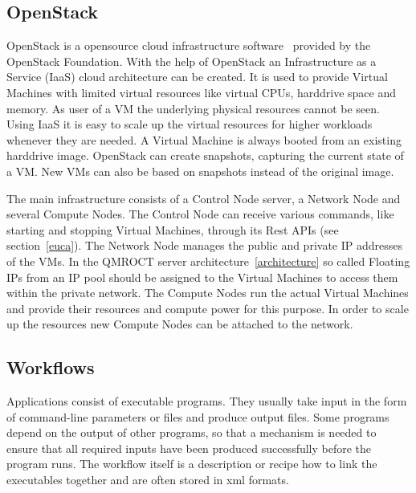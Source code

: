 \subsection{OpenStack}\label{openstack}

OpenStack is a opensource cloud infrastructure software~\cite{openstackhome} provided by the OpenStack Foundation.
With the help of OpenStack an Infrastructure as a Service (IaaS) cloud architecture can be created.
It is used to provide Virtual Machines with limited virtual resources like virtual CPUs, harddrive space and memory.
As user of a VM the underlying physical resources cannot be seen.
Using IaaS it is easy to scale up the virtual resources for higher workloads whenever they are needed.
A Virtual Machine is always booted from an existing harddrive image.
OpenStack can create snapshots, capturing the current state of a VM.
New VMs can also be based on snapshots instead of the original image.

The main infrastructure consists of a Control Node server, a Network Node and several Compute Nodes.
The Control Node can receive various commands, like starting and stopping Virtual Machines, through its Rest APIs (see section~\ref{euca}).
The Network Node manages the public and private IP addresses of the VMs.
In the QMROCT server architecture~\ref{architecture} so called Floating IPs from an IP pool should be assigned to the Virtual Machines to access them within the private network.
The Compute Nodes run the actual Virtual Machines and provide their resources and compute power for this purpose.
In order to scale up the resources new Compute Nodes can be attached to the network.

\subsection{Workflows}\label{workflows}

Applications consist of executable programs.
They usually take input in the form of command-line parameters or files and produce output files.
Some programs depend on the output of other programs, so that a mechanism is needed to ensure that all required inputs have been produced successfully before the program runs.
The workflow itself is a description or recipe how to link the executables together and are often stored in xml formats.

